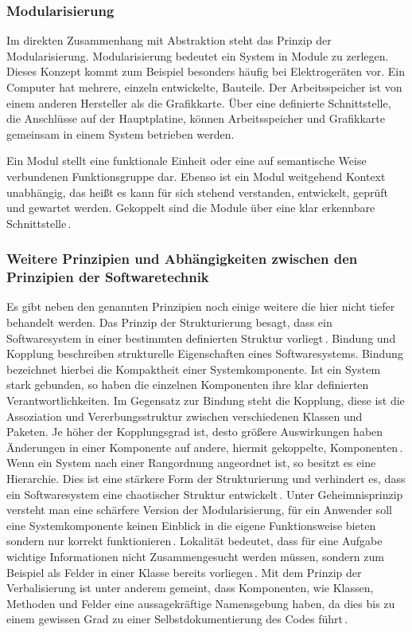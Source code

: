 \documentclass[12pt,oneside,a4paper,parskip]{scrbook}
\begin{document}
\subsubsection{Modularisierung}

Im direkten Zusammenhang mit Abstraktion steht das Prinzip der Modularisierung. Modularisierung bedeutet ein System in Module zu zerlegen. Dieses Konzept kommt zum Beispiel besonders häufig bei Elektrogeräten vor. Ein Computer hat mehrere, einzeln entwickelte, Bauteile. Der Arbeitsspeicher ist von einem anderen Hersteller als die Grafikkarte. Über eine definierte Schnittstelle, die Anschlüsse auf der Hauptplatine, können Arbeitsspeicher und Grafikkarte gemeinsam in einem System betrieben werden.

Ein Modul stellt eine funktionale Einheit oder eine auf semantische Weise verbundenen Funktionsgruppe dar. Ebenso ist ein Modul weitgehend Kontext unabhängig, das heißt es kann für sich stehend verstanden, entwickelt, geprüft und gewartet werden. Gekoppelt sind die Module über eine klar erkennbare Schnittstelle\,\cite[S. 41]{balzert2009a}.

\subsubsection{Weitere Prinzipien und Abhängigkeiten zwischen den Prinzipien der Softwaretechnik}

Es gibt neben den genannten Prinzipien noch einige weitere die hier nicht tiefer behandelt werden. Das Prinzip der Strukturierung besagt, dass ein Softwaresystem in einer bestimmten definierten Struktur vorliegt\,\cite[S. 34ff.]{balzert2009a}. Bindung und Kopplung beschreiben strukturelle Eigenschaften eines Softwaresystems. Bindung bezeichnet hierbei die Kompaktheit einer Systemkomponente. Ist ein System stark gebunden, so haben die einzelnen Komponenten ihre klar definierten Verantwortlichkeiten. Im Gegensatz zur Bindung steht die Kopplung, diese ist die Assoziation und Vererbungsstruktur zwischen verschiedenen Klassen und Paketen. Je höher der Kopplungsgrad ist, desto größere Auswirkungen haben Änderungen in einer Komponente auf andere, hiermit gekoppelte, Komponenten\,\cite[S. 37f.]{balzert2009a}. Wenn ein System nach einer Rangordnung angeordnet ist, so besitzt es eine Hierarchie. Dies ist eine stärkere Form der Strukturierung und verhindert es, dass ein Softwaresystem eine chaotischer Struktur entwickelt\,\cite[S. 39ff.]{balzert2009a}. Unter Geheimnisprinzip versteht man eine schärfere Version der Modularisierung, für ein Anwender soll eine Systemkomponente keinen Einblick in die eigene Funktionsweise bieten sondern nur korrekt funktionieren\,\cite[S. 42ff.]{balzert2009a}. Lokalität bedeutet, dass für eine Aufgabe wichtige Informationen nicht Zusammengesucht werden müssen, sondern zum Beispiel als Felder in einer Klasse bereits vorliegen\,\cite[S. 45f.]{balzert2009a}. Mit dem Prinzip der Verbalisierung ist unter anderem gemeint, dass Komponenten, wie Klassen, Methoden und Felder eine aussagekräftige Namensgebung haben, da dies bis zu einem gewissen Grad zu einer Selbstdokumentierung des Codes führt\,\cite[S. 46ff.]{balzert2009a}.
\end{document}
